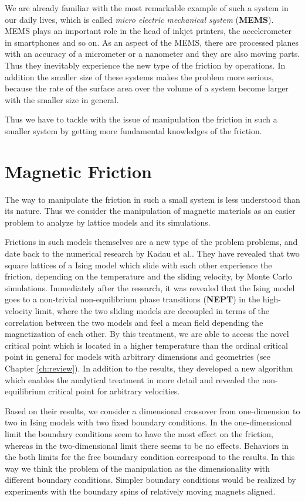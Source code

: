 We are already familiar with the most remarkable example of such a system in our daily lives, which is called \textit{micro electric mechanical system} (\textbf{MEMS}). MEMS plays an important role in the head of inkjet printers, the accelerometer in smartphones and so on. As an aspect of the MEMS, there are processed planes with an accuracy of a micrometer or a nanometer and they are also moving parts. Thus they inevitably experience the new type of the friction by operations. In addition the smaller size of these systems makes the problem more serious, because the rate of the surface area over the volume of a system become larger with the smaller size in general.

Thus we have to tackle with the issue of manipulation the friction in such a smaller system by getting more fundamental knowledges of the friction.

\section{Magnetic Friction}
The way to manipulate the friction in such a small system is less understood than its nature. Thus we consider the manipulation of magnetic materials as an easier problem to analyze by lattice models and its simulations. 

Frictions in such models themselves are a new type of the problem problems, and date back to the numerical research by Kadau et al.\cite{Kadau2008}. They have revealed that two square lattices of a Ising model which slide with each other experience the friction, depending on the temperature and the sliding velocity, by Monte Carlo simulations. Immediately after the research, it was revealed that the Ising model goes to a non-trivial non-equilibrium phase transitions (\textbf{NEPT}) in the high-velocity limit, where the two sliding models are decoupled in terms of the correlation between the two models and feel a mean field depending the magnetization of each other\cite{Hucht2009b}. By this treatment, we are able to access the novel critical point which is located in a higher temperature than the ordinal critical point in general for models with arbitrary dimensions and geometries (see Chapter \ref{ch:review}). In addition to the results, they developed a new algorithm which enables the analytical treatment in more detail and revealed the non-equilibrium critical point for arbitrary velocities. 

Based on their results\cite{Hucht2009b}, we consider a dimensional crossover from one-dimension to two in Ising models with two fixed boundary conditions. In the one-dimensional limit the boundary conditions seem to have the most effect on the friction, whereas in the two-dimensional limit there seems to be no effects. Behaviors in the both limits for the free boundary condition correspond to the results\cite{Hucht2009b}. In this way we think the problem of the manipulation as the dimensionality with different boundary conditions. Simpler boundary conditions would be realized by experiments with the boundary spins of relatively moving magnets aligned.